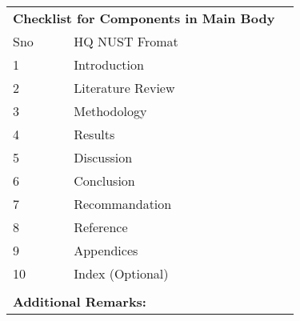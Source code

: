 \begin{table}[!ht]
\footnotesize
\begin{adjustbox}{width=\linewidth,center}
\begin{tabular}{p{0.6cm}p{9cm}p{0.6cm}}
\multicolumn{2}{l}{\textbf{Checklist for Components in Main Body}}                                                               &  \\
Sno            & HQ NUST Fromat                                                                                                  &  \\
1              & Introduction                                                                                                    &  \\
2              & Literature Review                                                                                               &  \\
3              & Methodology                                                                                                     &  \\
4              & Results                                                                                                         &  \\
5              & Discussion                                                                                                      &  \\
6              & Conclusion                                                                                                      &  \\
7              & Recommandation                                                                                                  &  \\
8              & Reference                                                                                                       &  \\
9              & Appendices                                                                                                      &  \\
10             & Index (Optional)                                                                                                &  \\
               &                                                                                                                 &  \\
\multicolumn{2}{l}{\textbf{Additional Remarks:}}                                                                                 &  \\ \cline{1-2}

\end{tabular}
\end{adjustbox}
\end{table}
